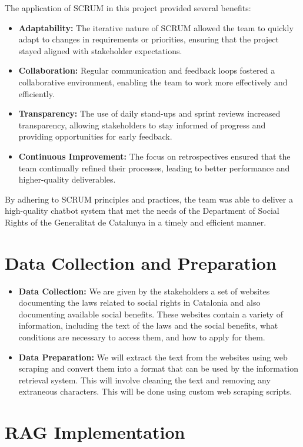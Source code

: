 \documentclass[a4paper,12pt,twoside]{ThesisStyle}
\begin{document}
The application of SCRUM in this project provided several benefits:
\begin{itemize}
    \item \textbf{Adaptability:} The iterative nature of SCRUM allowed the team to quickly adapt to changes in requirements or priorities, ensuring that the project stayed aligned with stakeholder expectations.
    \item \textbf{Collaboration:} Regular communication and feedback loops fostered a collaborative environment, enabling the team to work more effectively and efficiently.
    \item \textbf{Transparency:} The use of daily stand-ups and sprint reviews increased transparency, allowing stakeholders to stay informed of progress and providing opportunities for early feedback.
    \item \textbf{Continuous Improvement:} The focus on retrospectives ensured that the team continually refined their processes, leading to better performance and higher-quality deliverables.
\end{itemize}

By adhering to SCRUM principles and practices, the team was able to deliver a high-quality chatbot system that met the needs of the Department of Social Rights of the Generalitat de Catalunya in a timely and efficient manner.

\section{Data Collection and Preparation}
\label{sec:data}

\begin{itemize}
  \item \textbf{Data Collection:} We are given by the stakeholders a set of websites documenting the laws related to social rights in Catalonia and also documenting available social benefits. These websites contain a variety of information, including the text of the laws and the social benefits, what conditions are necessary to access them, and how to apply for them.
  \item \textbf{Data Preparation:} We will extract the text from the websites using web scraping and convert them into a format that can be used by the information retrieval system. This will involve cleaning the text and removing any extraneous characters. This will be done using custom web scraping scripts.
\end{itemize}

\section{RAG Implementation}
\label{sec:rag-implementation}
\end{document}
